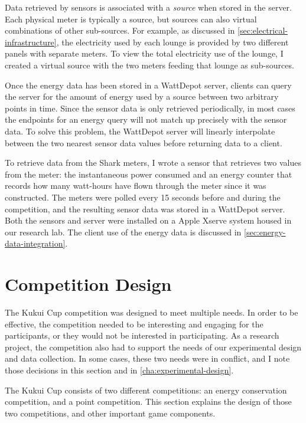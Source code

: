 Data retrieved by sensors is associated with a \emph{source} when stored in the server. Each physical meter is typically a source, but sources can also virtual combinations of other sub-sources. For example, as discussed in \autoref{sec:electrical-infrastructure}, the electricity used by each lounge is provided by two different panels with separate meters. To view the total electricity use of the lounge, I created a virtual source with the two meters feeding that lounge as sub-sources.

Once the energy data has been stored in a WattDepot server, clients can query the server for the amount of energy used by a source between two arbitrary points in time. Since the sensor data is only retrieved periodically, in most cases the endpoints for an energy query will not match up precisely with the sensor data. To solve this problem, the WattDepot server will linearly interpolate between the two nearest sensor data values before returning data to a client.

To retrieve data from the Shark meters, I wrote a sensor that retrieves two values from the meter: the instantaneous power consumed and an energy counter that records how many watt-hours have flown through the meter since it was constructed. The meters were polled every 15 seconds before and during the competition, and the resulting sensor data was stored in a WattDepot server. Both the sensors and server were installed on a Apple Xserve system housed in our research lab. The client use of the energy data is discussed in \autoref{sec:energy-data-integration}.


\section{Competition Design}

The Kukui Cup competition was designed to meet multiple needs. In order to be effective, the competition needed to be interesting and engaging for the participants, or they would not be interested in participating. As a research project, the competition also had to support the needs of our experimental design and data collection. In some cases, these two needs were in conflict, and I note those decisions in this section and in \autoref{cha:experimental-design}.

The Kukui Cup consists of two different competitions: an energy conservation competition, and a point competition. This section explains the design of those two competitions, and other important game components.


